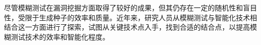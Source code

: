 %
%
%
%

\begin{conclusion}

    尽管模糊测试在漏洞挖掘方面取得了较好的成果，但其仍存在一定的随机性和盲目性，受限于生成种子的效率和质量。近年来，研究人员从模糊测试与智能化技术相结合这一方面进行了探索，试图从关键技术点入手，找到合适的结合点，以提高模糊测试技术的效率和智能化程度。

\end{conclusion}

